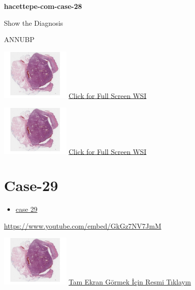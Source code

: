 \documentclass[
  letterpaper,
  paper=6in:9in,
  pagesize=pdftex,
  headinclude=on,
  footinclude=on,
  12pt]{scrbook}
\providecommand{\tightlist}{%
  \setlength{\itemsep}{0pt}\setlength{\parskip}{0pt}}\usepackage{longtable,booktabs,array}
\begin{document}
\textbf{hacettepe-com-case-28}

Show the Diagnosis

\hypertarget{answer28}{}
ANNUBP

\href{https://images.patolojiatlasi.com/hacettepe-com-case-1/HE.html}{\includegraphics[width=0.25\textwidth,height=\textheight]{./screenshots/hacettepe-com-case-1_screenshot.png}}
\href{https://images.patolojiatlasi.com/hacettepe-com-case-28/HE1.html}{Click
for Full Screen WSI}

\href{https://images.patolojiatlasi.com/hacettepe-com-case-1/HE.html}{\includegraphics[width=0.25\textwidth,height=\textheight]{./screenshots/hacettepe-com-case-1_screenshot.png}}
\href{https://images.patolojiatlasi.com/hacettepe-com-case-28/HE2.html}{Click
for Full Screen WSI}

\hypertarget{sec-hacettepe-case-of-the-month-case-29}{%
\section{Case-29}\label{sec-hacettepe-case-of-the-month-case-29}}

\begin{itemize}
\tightlist
\item
  \href{https://www.youtube.com/watch?v=GkGz7NV7JmM\&ab_channel=KemalKosemehmetoglu}{case
  29}
\end{itemize}

\url{https://www.youtube.com/embed/GkGz7NV7JmM}

\href{https://images.patolojiatlasi.com/hacettepe-com-case-1/HE.html}{\includegraphics[width=0.25\textwidth,height=\textheight]{./screenshots/hacettepe-com-case-1_screenshot.png}}
\href{https://images.patolojiatlasi.com/hacettepe-com-case-/HE.html}{Tam
Ekran Görmek İçin Resmi Tıklayın}
\end{document}
